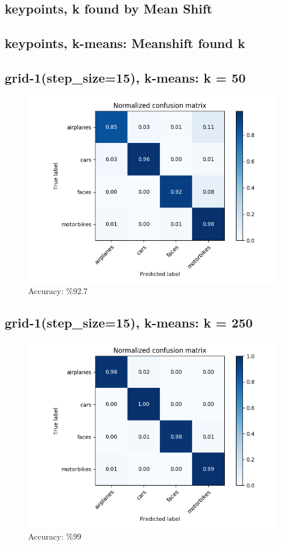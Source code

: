 \subsection*{keypoints, k found by Mean Shift}
\subsection*{keypoints, k-means: Meanshift found k}

\subsection*{grid-1(step\_size=15), k-means: k = 50}
\begin{figure}[H]
    \centering
    \includegraphics[width=\textwidth]{images/confusion-stp-15-50.png}
    \caption*{Accuracy: \%92.7}
\end{figure}

\subsection*{grid-1(step\_size=15), k-means: k = 250}
\begin{figure}[H]
    \centering
    \includegraphics[width=\textwidth]{images/confusion-stp-15-250.png}
    \caption*{Accuracy: \%99}
\end{figure}


